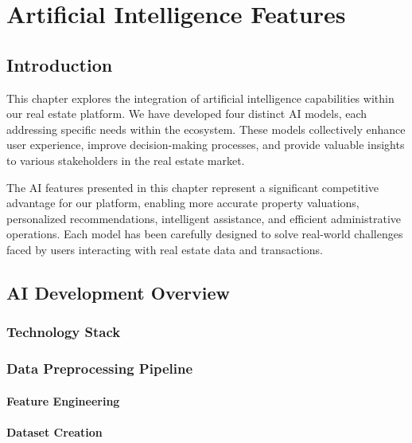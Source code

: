 \chapter{Artificial Intelligence Features}


\section*{Introduction}

This chapter explores the integration of artificial intelligence capabilities within our real estate platform. We have developed four distinct AI models, each addressing specific needs within the ecosystem. These models collectively enhance user experience, improve decision-making processes, and provide valuable insights to various stakeholders in the real estate market.

The AI features presented in this chapter represent a significant competitive advantage for our platform, enabling more accurate property valuations, personalized recommendations, intelligent assistance, and efficient administrative operations. Each model has been carefully designed to solve real-world challenges faced by users interacting with real estate data and transactions.

\section{AI Development Overview}
\subsection{Technology Stack}


\subsection{Data Preprocessing Pipeline}
\subsubsection{Feature Engineering}


\subsubsection{Dataset Creation}


